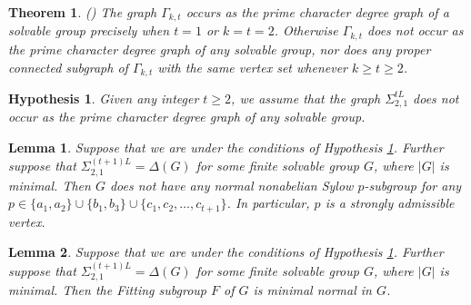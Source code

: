 \documentclass[10pt,a4paper]{amsart}
\newtheorem{lemma}{Lemma}
\newtheorem{theorem}{Theorem}
\newtheorem{hyp}{Hypothesis}
\newcommand{\SLi}[3]{\Sigma_{#1,#2}^{#3L}} %
\begin{document}
\begin{theorem}\label{KT}\emph{(\cite{BL})}
The graph $\Gamma_{k,t}$ occurs as the prime character degree graph of a solvable group precisely when $t=1$ or $k=t=2$. Otherwise $\Gamma_{k,t}$ does not occur as the prime character degree graph of any solvable group, nor does any proper connected subgraph of $\Gamma_{k,t}$ with the same vertex set whenever $k\geq t\geq2$.
\end{theorem}

\begin{hyp}\label{hyp21mL}
Given any integer $t\geq2$, we assume that the graph $\SLi{2}{1}{t}$ does not occur as the prime character degree graph of any solvable group.
\end{hyp}

\begin{lemma}\label{lem21ad}
Suppose that we are under the conditions of Hypothesis \ref{hyp21mL}. Further suppose that $\SLi{2}{1}{(t+1)}=\Delta(G)$ for some finite solvable group $G$, where $|G|$ is minimal. Then $G$ does not have any normal nonabelian Sylow $p$-subgroup for any $p\in\{a_1,a_2\}\cup\{b_1,b_3\}\cup\{c_1,c_2,\ldots,c_{t+1}\}$. In particular, $p$ is a strongly admissible vertex.
\end{lemma}

\begin{lemma}\label{lem21mLfit}
Suppose that we are under the conditions of Hypothesis \ref{hyp21mL}. Further suppose that $\SLi{2}{1}{(t+1)}=\Delta(G)$ for some finite solvable group $G$, where $|G|$ is minimal. Then the Fitting subgroup $\textit{F}$ of $G$ is minimal normal in $G$.
\end{lemma}
\end{document}
